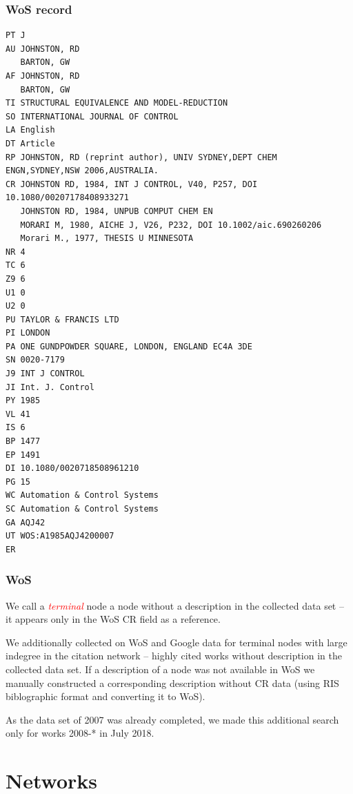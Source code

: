 \documentclass[hyperref={pdfstartview={FitBH -32768},
                         pdfpagemode=FullScreen,
                         plainpages=false,
                         colorlinks=true}
              ]{beamer}
\newcommand{\keyw}[1]{\textcolor{red}{\emph{#1}}}
\begin{document}
\begin{frame}[fragile]
\frametitle{WoS record}
\renewcommand{\baselinestretch}{0.8}
\tiny
\begin{verbatim}
PT J
AU JOHNSTON, RD
   BARTON, GW
AF JOHNSTON, RD
   BARTON, GW
TI STRUCTURAL EQUIVALENCE AND MODEL-REDUCTION
SO INTERNATIONAL JOURNAL OF CONTROL
LA English
DT Article
RP JOHNSTON, RD (reprint author), UNIV SYDNEY,DEPT CHEM ENGN,SYDNEY,NSW 2006,AUSTRALIA.
CR JOHNSTON RD, 1984, INT J CONTROL, V40, P257, DOI 10.1080/00207178408933271
   JOHNSTON RD, 1984, UNPUB COMPUT CHEM EN
   MORARI M, 1980, AICHE J, V26, P232, DOI 10.1002/aic.690260206
   Morari M., 1977, THESIS U MINNESOTA
NR 4
TC 6
Z9 6
U1 0
U2 0
PU TAYLOR & FRANCIS LTD
PI LONDON
PA ONE GUNDPOWDER SQUARE, LONDON, ENGLAND EC4A 3DE
SN 0020-7179
J9 INT J CONTROL
JI Int. J. Control
PY 1985
VL 41
IS 6
BP 1477
EP 1491
DI 10.1080/0020718508961210
PG 15
WC Automation & Control Systems
SC Automation & Control Systems
GA AQJ42
UT WOS:A1985AQJ4200007
ER
\end{verbatim}

\end{frame}

\begin{frame}[fragile]
\frametitle{WoS}
\small

We call a \keyw{terminal} node  a node without a description in the collected data set -- it appears only in the WoS CR field as a reference. \medskip

We additionally collected on WoS and Google data for terminal nodes with large indegree in the citation network -- highly cited works without description in the collected data set. If a description of a node was not available in WoS we manually constructed a corresponding description without CR data (using RIS biblographic format and converting it to WoS).\medskip

As the data set of 2007 was already completed, we made this additional search only for works 2008-* in July 2018. 
\end{frame}


\section{Networks}

\end{document}
